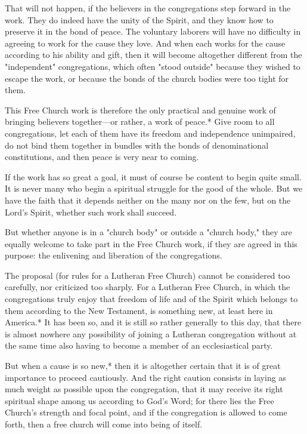 That will not happen, if the believers in the congregations step forward in the work. They do indeed have the unity of the Spirit, and they know how to preserve it in the bond of peace. The voluntary laborers will have no difficulty in agreeing to work for the cause they love. And when each works for the cause according to his ability and gift, then it will become altogether different from the "independent" congregations, which often "stood outside" because they wished to escape the work, or because the bonds of the church bodies were too tight for them.

This Free Church work is therefore the only practical and genuine work of bringing believers together---or rather, a work of peace.* Give room to all congregations, let each of them have its freedom and independence unimpaired, do not bind them together in bundles with the bonds of denominational constitutions, and then peace is very near to coming.

If the work has so great a goal, it must of course be content to begin quite small. It is never many who begin a spiritual struggle for the good of the whole. But we have the faith that it depends neither on the many nor on the few, but on the Lord’s Spirit, whether such work shall succeed.

But whether anyone is in a "church body" or outside a "church body," they are equally welcome to take part in the Free Church work, if they are agreed in this purpose: the enlivening and liberation of the congregations.

The proposal (for rules for a Lutheran Free Church) cannot be considered too carefully, nor criticized too sharply. For a Lutheran Free Church, in which the congregations truly enjoy that freedom of life and of the Spirit which belongs to them according to the New Testament, is something new, at least here in America.* It has been so, and it is still so rather generally to this day, that there is almost nowhere any possibility of joining a Lutheran congregation without at the same time also having to become a member of an ecclesiastical party.

But when a cause is so new,* then it is altogether certain that it is of great importance to proceed cautiously. And the right caution consists in laying as much weight as possible upon the congregation, that it may receive its right spiritual shape among us according to God’s Word; for there lies the Free Church’s strength and focal point, and if the congregation is allowed to come forth, then a free church will come into being of itself.


